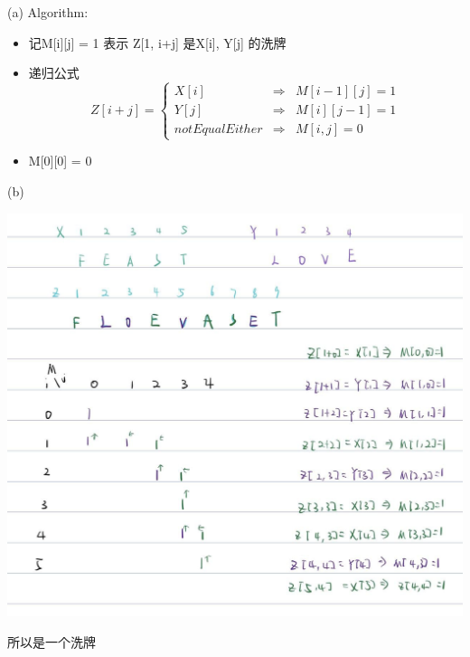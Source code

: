 \documentclass[12pt,a4paper]{article}
\begin{document}
\begin{CJK*}{UTF8}{gbsn}
			(a) Algorithm:

			\begin{itemize}
				\item 记M[i][j] = 1 表示 Z[1, i+j] 是X[i], Y[j] 的洗牌
				\item 递归公式 $$
					Z[i+j] = \left\{\begin{array}{lcl}
							X[i] & \Rightarrow & M[i-1][j] = 1\\
							Y[j] & \Rightarrow & M[i][j-1] = 1\\
							not Equal Either& \Rightarrow & M[i,j] = 0
						\end{array}
						$$
					\item M[0][0] = 0
				\end{itemize}

				(b) 

				\includegraphics[width=15cm]{img/answ3.jpg}

				所以是一个洗牌
			\end{CJK*}
			
\end{document}
